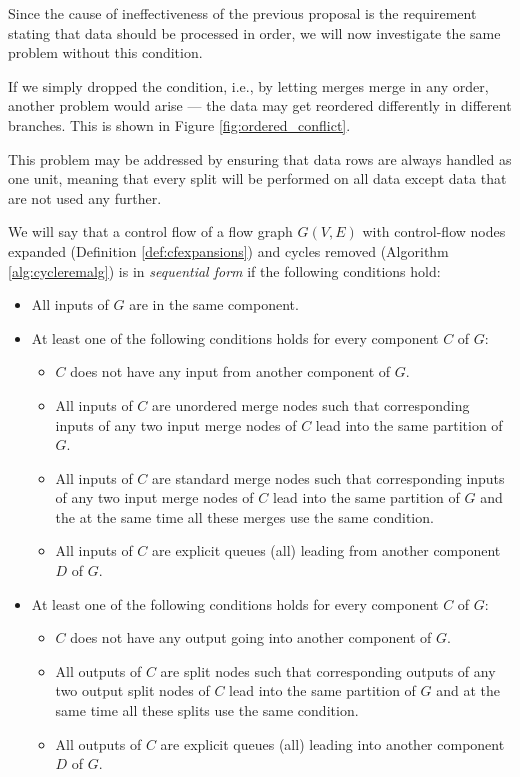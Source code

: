 Since the cause of ineffectiveness of the previous proposal is the requirement stating that data should be processed in order, we will now investigate the same problem without this condition. 

\label{sec:unordered}

\FloatBarrier

If we simply dropped the condition, i.e., by letting merges merge in any order, another problem would arise --- the data may get reordered differently in different branches. This is shown in Figure \ref{fig:ordered_conflict}.


This problem may be addressed by ensuring that data rows are always handled as one unit, meaning that every split will be performed on all data except data that are not used any further.

\FloatBarrier

We will say that a control flow of a flow graph $G(V,E)$ with control-flow nodes expanded (Definition \ref{def:cfexpansions}) and cycles removed (Algorithm \ref{alg:cycleremalg}) is in \emph{sequential form} if the following conditions hold:
\begin{itemize}
  \item All inputs of $G$ are in the same component.
  \item At least one of the following conditions holds for every component $C$ of $G$: 
    \begin{itemize}
      \item $C$ does not have any input from another component of $G$.
      \item All inputs of $C$ are unordered merge nodes such that corresponding inputs of any two input merge nodes of $C$ lead into the same partition of $G$.
      \item All inputs of $C$ are standard merge nodes such that corresponding inputs of any two input merge nodes of $C$ lead into the same partition of $G$ and the at the same time all these merges use the same condition.
      \item All inputs of $C$ are explicit queues (all) leading from another component $D$ of $G$.
    \end{itemize}
  \item At least one of the following conditions holds for every component $C$ of $G$: 
    \begin{itemize}
      \item $C$ does not have any output going into another component of $G$.
      \item All outputs of $C$ are split nodes such that corresponding outputs of any two output split nodes of $C$ lead into the same partition of $G$ and at the same time all these splits use the same condition.
      \item All outputs of $C$ are explicit queues (all) leading into another component $D$ of $G$.
    \end{itemize}
\end{itemize}
\myenddef


